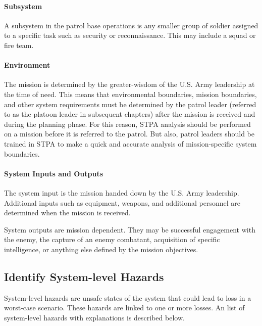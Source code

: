 \documentclass[../../main/main.tex]{subfiles}
\begin{document}
\paragraph*{Subsystem}
A subsystem in the patrol base operations is any smaller group of soldier assigned to a specific task such as security or reconnaissance.  This may include a squad or fire team.  

\paragraph*{Environment}
The mission is determined by the greater-wisdom of the U.S. Army leadership at the time of need.  This means that environmental boundaries, mission boundaries, and other system requirements must be determined by the patrol leader  (referred to as the platoon leader in subsequent chapters) after the mission is received and during the planning phase.  For this reason, STPA analysis should be performed on a mission before it is referred to the patrol.  But also, patrol leaders should be trained in STPA to make a quick and accurate analysis of mission-specific system boundaries.  


\paragraph*{System Inputs and Outputs}
The system input is the mission handed down by the U.S. Army leadership.  Additional inputs such as equipment, weapons, and additional personnel are determined when the mission is received. 

System outputs are mission dependent.  They may be successful engagement with the enemy, the capture of an enemy combatant, acquisition of specific intelligence, or anything else defined by the mission objectives.

\subsection{Identify System-level Hazards}
System-level hazards are unsafe states of the system that could lead to loss in a worst-case scenario. These hazards are linked to one or more losses.  An list of system-level hazards with explanations is described below.
\end{document}
